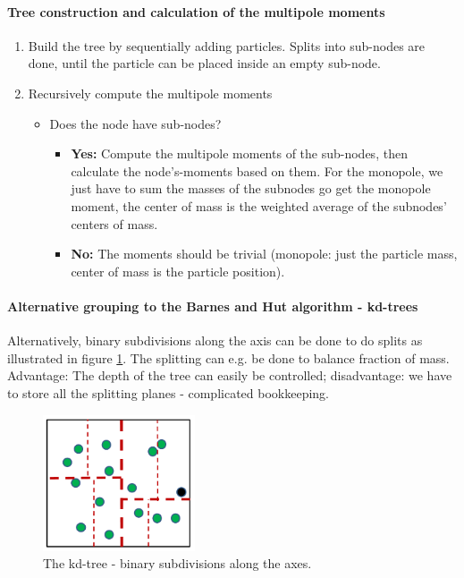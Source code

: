 \paragraph*{Tree construction and calculation of the multipole moments}
\begin{enumerate}
    \item Build the tree by sequentially adding particles. Splits into sub-nodes are done, until the particle can be placed inside an empty sub-node.
    \item Recursively compute the multipole moments
    \begin{itemize}
        \item Does the node have sub-nodes?
        \begin{itemize}
            \item \textbf{Yes:} Compute the multipole moments of the sub-nodes, then calculate the node's-moments based on them. For the monopole, we just have to sum the masses of the subnodes go get the monopole moment, the center of mass is the weighted average of the subnodes' centers of mass.
            \item \textbf{No:} The moments should be trivial (monopole: just the particle mass, center of mass is the particle position).
        \end{itemize}
    \end{itemize}
\end{enumerate}

\paragraph*{Alternative grouping to the Barnes and Hut algorithm - kd-trees}
Alternatively, binary subdivisions along the axis can be done to do splits
as illustrated in figure \ref{fig:kd_tree}. The splitting can
e.g. be done to balance fraction of mass. \textcolor{green1}{Advantage}: The depth
of the tree can easily be controlled; \textcolor{red1}{disadvantage}: 
we have to store all the splitting planes - complicated bookkeeping.

\begin{figure}[H]
    \centering
    \includegraphics[width=0.4\textwidth]{figures/kd_tree.pdf}
    \caption{The kd-tree - binary subdivisions along the axes.}
    \label{fig:kd_tree}
\end{figure}

